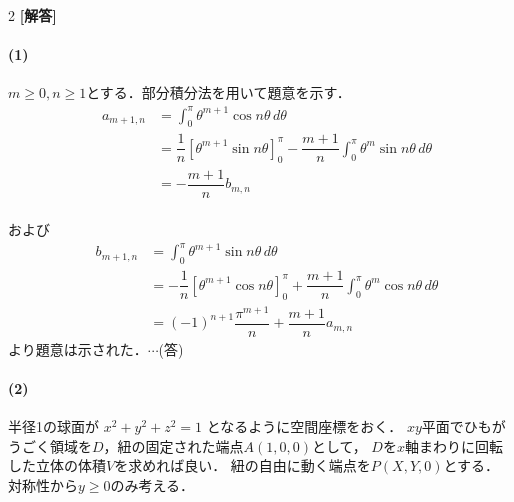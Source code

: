 \documentclass[../../main.tex]{subfiles}
\begin{document}
\setcounter{equation}{0}
\setcounter{figure}{0}
\setcounter{table}{0}
\begin{oframed}
  
\end{oframed}

\setlength{\columnseprule}{0.4pt}
\begin{multicols}{2}
  {\bf [解答]}
  \paragraph{(1)}
  $m \ge 0, n \ge 1$とする．部分積分法を用いて題意を示す．
  \begin{align}
    \quad a_{m+1,n}
    & = \int_0^\pi \theta^{m+1} \cos n\theta \, d\theta                                                                        \\
    & = \dfrac{1}{n} \left[ \theta^{m+1} \sin n\theta \right]_0^\pi - \dfrac{m+1}{n} \int_0^\pi \theta^m \sin n\theta \, d\theta \\
    & = -\dfrac{m+1}{n} b_{m,n}
  \end{align}                                                                                                                                                \\
  および
  \begin{align}
    \quad b_{m+1,n}
    & = \int_0^\pi \theta^{m+1} \sin n\theta \, d\theta                                                                         \\
    & = -\dfrac{1}{n} \left[ \theta^{m+1} \cos n\theta \right]_0^\pi + \dfrac{m+1}{n} \int_0^\pi \theta^m \cos n\theta \, d\theta \\
    & = (-1)^{n+1} \dfrac{\pi^{m+1}}{n} + \dfrac{m+1}{n} a_{m,n}
  \end{align}
  より題意は示された．$\cdots$(答)

  \paragraph{(2)}
  半径1の球面が $x^2+y^2+z^2=1$ となるように空間座標をおく．
  $xy$平面でひもがうごく領域を$D$，紐の固定された端点$A(1,0,0)$として，
  $D$を$x$軸まわりに回転した立体の体積$V$を求めれば良い．
  紐の自由に動く端点を$P(X,Y,0)$とする．
  対称性から$y \geq 0$のみ考える．

  \begin{figure}[H]
    \centering
\end{figure}
\end{multicols}
\end{document}
